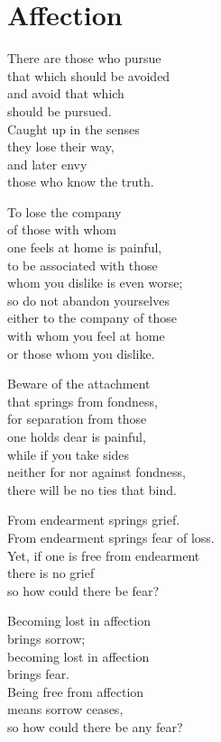 
\chapter{Affection}


There are those who pursue\\
that which should be avoided\\
and avoid that which\\
should be pursued.\\
Caught up in the senses\\
they lose their way,\\
and later envy\\
those who know the truth.


To lose the company\\
of those with whom\\
one feels at home is painful,\\
to be associated with those\\
whom you dislike is even worse;\\
so do not abandon yourselves\\
either to the company of those\\
with whom you feel at home\\
or those whom you dislike.


Beware of the attachment\\
that springs from fondness,\\
for separation from those\\
one holds dear is painful,\\
while if you take sides\\
neither for nor against fondness,\\
there will be no ties that bind.


From endearment springs grief.\\
From endearment springs fear of loss.\\
Yet, if one is free from endearment\\
there is no grief\\
so how could there be fear?


Becoming lost in affection\\
brings sorrow;\\
becoming lost in affection\\
brings fear.\\
Being free from affection\\
means sorrow ceases,\\
so how could there be any fear?


